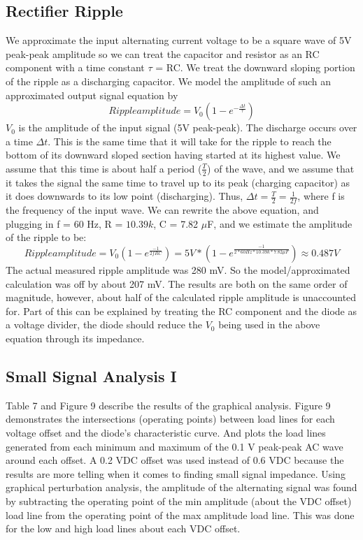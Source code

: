 \documentclass{article}
\begin{document}
\subsection{Rectifier Ripple}
    We approximate the input alternating current voltage to be a square wave of 5V peak-peak amplitude so we can treat the capacitor and resistor as an RC component with a time constant $\tau$ = RC. We treat the downward sloping portion of the ripple as a discharging capacitor. We model the amplitude of such an approximated output signal equation by 
    \begin{equation}
        Ripple amplitude = V_0(1-e^{-\frac{\Delta t}{\tau}})
    \end{equation}
    $V_0$ is the amplitude of the input signal (5V peak-peak). The discharge occurs over a time $\Delta t$. This is the same time that it will take for the ripple to reach the bottom of its downward sloped section having started at its highest value. We assume that this time is about half a period ($\frac{T}{2}$) of the wave, and we assume that it takes the signal the same time to travel up to its peak (charging capacitor) as it does downwards to its low point (discharging). Thus, $\Delta t =\frac{T}{2} = \frac{1}{2f}$, where f is the frequency of the input wave. We can rewrite the above equation, and plugging in f = 60 Hz, R = $10.39k$, C = 7.82 $\mu$F, and we estimate the amplitude of the ripple to be:
    \begin{equation}
        Ripple amplitude = V_0(1-e^{\frac{-1}{2fRC}}) = 5V*(1-e^{\frac{-1}{2*60Hz*10.39k*7.82\mu F}}) \approx 0.487 V
    \end{equation}
    The actual measured ripple amplitude was 280 mV. So the model/approximated calculation was off by about 207 mV. The results are both on the same order of magnitude, however, about half of the calculated ripple amplitude is unaccounted for. Part of this can be explained by treating the RC component and the diode as a voltage divider, the diode should reduce the $V_0$ being used in the above equation through its impedance. 
\subsection{Small Signal Analysis I}
    Table 7 and Figure 9 describe the results of the graphical analysis. Figure 9 demonstrates the intersections (operating points) between load lines for each voltage offset and the diode's characteristic curve. And plots the load lines generated from each minimum and maximum of the 0.1 V peak-peak AC wave around each offset. A 0.2 VDC offset was used instead of 0.6 VDC because the results are more telling when it comes to finding small signal impedance. Using graphical perturbation analysis, the amplitude of the alternating signal was found by subtracting the operating point of the min amplitude (about the VDC offset) load line from the operating point of the max amplitude load line. This was done for the low and high load lines about each VDC offset.
\end{document}
